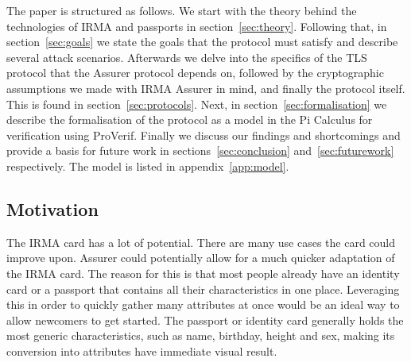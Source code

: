 The paper is structured as follows. We start with the theory behind the technologies of IRMA and passports in section~\ref{sec:theory}. Following that, in section~\ref{sec:goals} we state the goals that the protocol must satisfy and describe several attack scenarios. Afterwards we delve into the specifics of the TLS protocol that the Assurer protocol depends on, followed by the cryptographic assumptions we made with IRMA Assurer in mind, and finally the protocol itself. This is found in section~\ref{sec:protocols}. Next, in section~\ref{sec:formalisation} we describe the formalisation of the protocol as a model in the Pi Calculus for verification using ProVerif. Finally we discuss our findings and shortcomings and provide a basis for future work in sections~\ref{sec:conclusion} and~\ref{sec:futurework} respectively. The model is listed in appendix~\ref{app:model}.

\subsection{Motivation}
The IRMA card has a lot of potential. There are many use cases the card could improve upon. Assurer could potentially allow for a much quicker adaptation of the IRMA card. The reason for this is that most people already have an identity card or a passport that contains all their characteristics in one place. Leveraging this in order to quickly gather many attributes at once would be an ideal way to allow newcomers to get started. The passport or identity card generally holds the most generic characteristics, such as name, birthday, height and sex, making its conversion into attributes have immediate visual result.
